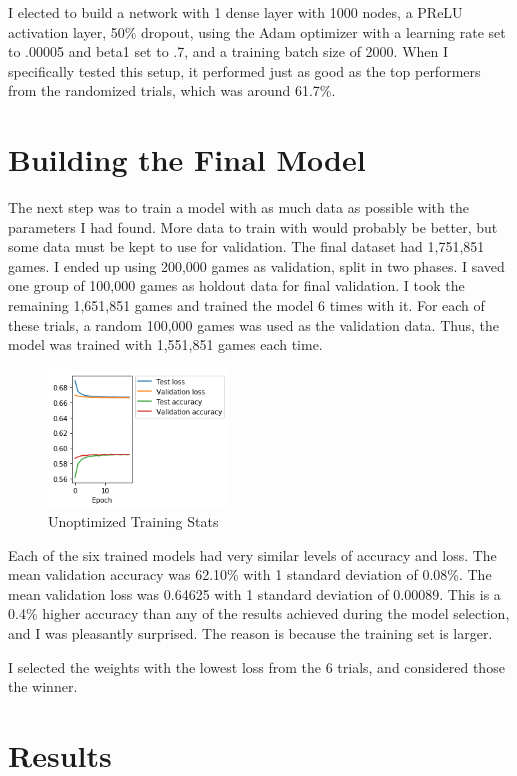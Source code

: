 \documentclass[twoside,twocolumn]{article}
\begin{document}
I elected to build a network with 1 dense layer with 1000 nodes, a PReLU activation layer,  50\% dropout, using the Adam optimizer with a learning rate set to .00005 and beta1 set to .7, and a training batch size of 2000.  When I specifically tested this setup, it performed just as good as the top performers from the randomized trials, which was around 61.7\%.

\section {Building the Final Model}

The next step was to train a model with as much data as possible with the parameters I had found.  More data to train with would probably be better, but some data must be kept to use for validation.  The final dataset had 1,751,851 games.  I ended up using 200,000 games as validation, split in two phases.  I saved one group of 100,000 games as holdout data for final validation.  I took the remaining 1,651,851 games and trained the model 6 times with it.  For each of these trials, a random 100,000 games was used as the validation data.  Thus, the model was trained with 1,551,851 games each time.

\begin{figure}
\caption{Unoptimized Training Stats}
\label{figure:500training}
\includegraphics[width=136pt]{500training}
\end{figure}

Each of the six trained models had very similar levels of accuracy and loss.  The mean validation accuracy was 62.10\% with 1 standard deviation of 0.08\%.  The mean validation loss was  0.64625 with 1 standard deviation of 0.00089.  This is a 0.4\% higher accuracy than any of the results achieved during the model selection, and I was pleasantly surprised.  The reason is because the training set is larger.

I selected the weights with the lowest loss from the 6 trials, and considered those the winner.

\section {Results}
\end{document}
